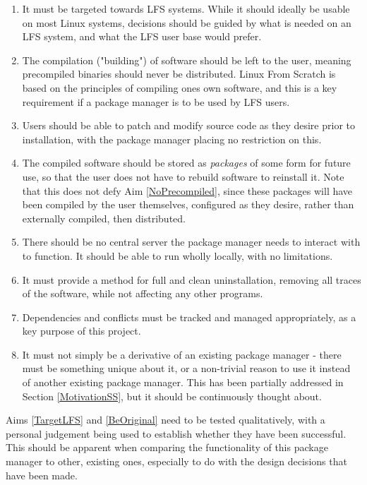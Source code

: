 \documentclass[10pt]{article}
\begin{document}
\begin{enumerate}
    \item It must be targeted towards LFS systems. While it should ideally be usable on most Linux systems, decisions should be guided by what is needed on an LFS system, and what the LFS user base would prefer. \label{TargetLFS}
    \item The compilation ("building") of software should be left to the user, meaning precompiled binaries should never be distributed. Linux From Scratch is based on the principles of compiling ones own software, and this is a key requirement if a package manager is to be used by LFS users. \label{NoPrecompiled}
    \item Users should be able to patch and modify source code as they desire prior to installation, with the package manager placing no restriction on this. \label{AllowPatching}
    \item The compiled software should be stored as \textit{packages} of some form for future use, so that the user does not have to rebuild software to reinstall it. Note that this does not defy Aim \ref{NoPrecompiled}, since these packages will have been compiled by the user themselves, configured as they desire, rather than externally compiled, then distributed. \label{StorePkgs}
    \item There should be no central server the package manager needs to interact with to function. It should be able to run wholly locally, with no limitations. \label{NoServer}
    \item It must provide a method for full and clean uninstallation, removing all traces of the software, while not affecting any other programs. \label{UninstallPkgs}
    \item Dependencies and conflicts must be tracked and managed appropriately, as a key purpose of this project. \label{TrackDeps}
    \item It must not simply be a derivative of an existing package manager - there must be something unique about it, or a non-trivial reason to use it instead of another existing package manager. This has been partially addressed in Section \ref{MotivationSS}, but it should be continuously thought about. \label{BeOriginal}
\end{enumerate}

Aims \ref{TargetLFS} and \ref{BeOriginal} need to be tested qualitatively, with a personal judgement being used to establish whether they have been successful. This should be apparent when comparing the functionality of this package manager to other, existing ones, especially to do with the design decisions that have been made.
\end{document}
